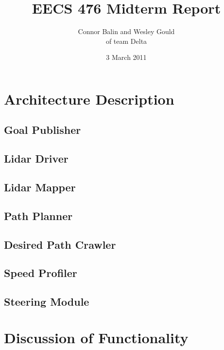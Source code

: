 \documentclass{report}
\author{Connor Balin and Wesley Gould \\ of team Delta}
\title{EECS 476 Midterm Report}
\date{3 March 2011}
\begin{document}
\maketitle

\section{Architecture Description}

\subsection{Goal Publisher}

\subsection{Lidar Driver}

\subsection{Lidar Mapper}

\subsection{Path Planner}

\subsection{Desired Path Crawler}

\subsection{Speed Profiler}

\subsection{Steering Module}

\section{Discussion of Functionality}
\end{document}
